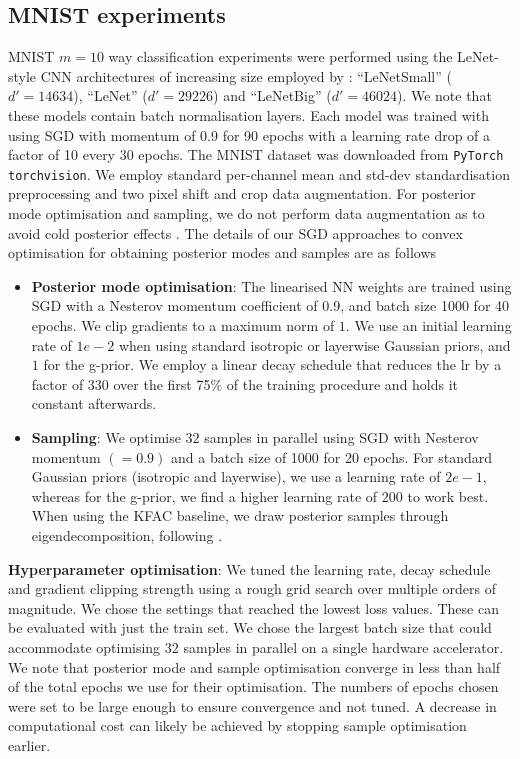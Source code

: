 \subsection{MNIST experiments}
\label{app:mnist_experiments}
MNIST $m{=}10$ way classification experiments were performed using the LeNet-style CNN architectures of increasing size employed by \textcite{antoran2022linearised}: ``LeNetSmall'' ($d'{=}14634$), ``LeNet'' ($d'{=}29226$) and ``LeNetBig'' ($d'{=}46024$). We note that these models contain batch normalisation layers. Each model was trained with using SGD with momentum of 0.9 for 90 epochs with a learning rate drop of a factor of 10 every 30 epochs. The MNIST dataset was downloaded from \texttt{PyTorch torchvision}. We employ standard per-channel mean and std-dev standardisation preprocessing and two pixel shift and crop data augmentation. For posterior mode optimisation and sampling, we do not perform data augmentation as to avoid cold posterior effects \citep{izmailov2021what}.
The details of our SGD approaches to convex optimisation for obtaining posterior modes and samples are as follows
\begin{itemize}
    \item \textbf{Posterior mode optimisation}: The linearised NN weights are trained using SGD with a Nesterov momentum coefficient of 0.9, and batch size 1000 for 40 epochs. We clip gradients to a maximum norm of $1$. We use an initial learning rate of $1e-2$ when using standard isotropic or layerwise Gaussian priors, and $1$ for the g-prior. We employ a linear decay schedule that reduces the lr by a factor of 330 over the first 75$\%$ of the training procedure and holds it constant afterwards.
    \item \textbf{Sampling}: We optimise $32$ samples in parallel using SGD with Nesterov momentum $({=}0.9)$ and a batch size of 1000 for 20 epochs. For standard Gaussian priors (isotropic and layerwise), we use a learning rate of $2e{-}1$, whereas for the g-prior, we find a higher learning rate of $200$ to work best. When using the KFAC baseline, we draw posterior samples through eigendecomposition, following \textcite{daxberger2021laplace}.
\end{itemize}
\textbf{Hyperparameter optimisation}: We tuned the learning rate, decay schedule and gradient clipping strength using a rough grid search over multiple orders of magnitude. We chose the settings that reached the lowest loss values. These can be evaluated with just the train set. We chose the largest batch size that could accommodate optimising $32$ samples in parallel on a single hardware accelerator. We note that posterior mode and sample optimisation converge in less than half of the total epochs we use for their optimisation. The numbers of epochs chosen were set to be large enough to ensure convergence and not tuned. A decrease in computational cost can likely be achieved by stopping sample optimisation earlier. 

